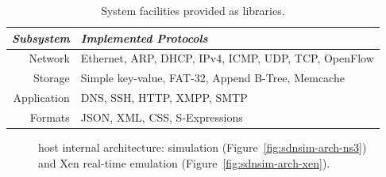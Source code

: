 \begin{table}
\centering
\begin{tabular}{r|p{}}
\emph{Subsystem} & \emph{Implemented Protocols} \\
\hline 
Network     & Ethernet, ARP, DHCP, IPv4, ICMP, UDP, TCP, OpenFlow\\ 
Storage     & Simple key-value, FAT-32, Append B-Tree, Memcache \\
Application & DNS, SSH, HTTP, XMPP, SMTP  \\ 
Formats     & JSON, XML, CSS, S-Expressions\\
\end{tabular}
\caption{\label{t:facilities}System facilities provided as \mirage{}
        libraries.}
\end{table}

\begin{figure}[ht] 
\centering
{}
\caption[\sdnsim host internal architecture]{\sdnsim host internal architecture: 
  simulation (Figure~\ref{fig:sdnsim-arch-ns3}) and Xen real-time
  emulation (Figure~\ref{fig:sdnsim-arch-xen}).}
\label{fig:sdnsim-arch}
\end{figure}


